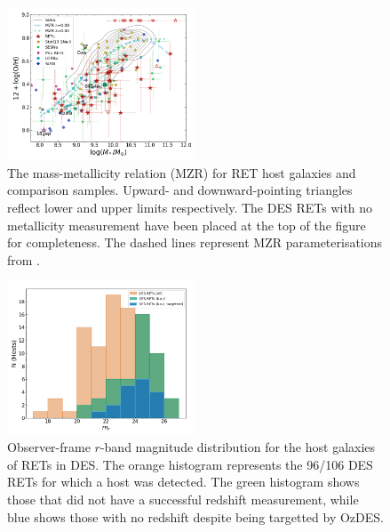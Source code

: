 \documentclass[fleqn,usenatbib,]{mnras}
\newcommand{\phil}[1]{\color{red}#1 \color{black}}
\begin{document}
\begin{figure}
\includegraphics[width=0.5\textwidth]{figs/RET_MZR.png}
\caption{The mass-metallicity relation (MZR) for RET host galaxies and comparison samples. \phil{Upward- and downward-pointing triangles reflect lower and upper limits respectively. The DES RETs with no metallicity measurement have been placed at the top of the figure for completeness. The dashed lines represent MZR parameterisations from \citet{Zahid2014}.}
\label{fig:mzr}}
\end{figure}

\begin{figure}
\includegraphics[width=0.5\textwidth]{figs/mag_dist.png}
\caption{Observer-frame $r$-band magnitude distribution for the host galaxies of RETs in DES. The orange histogram represents the 96/106 DES RETs for which a host was detected. The green histogram shows those that did not have a successful redshift measurement, while blue shows those with no redshift despite being targetted by OzDES.
\label{fig:mag_dist}}
\end{figure}
\end{document}
